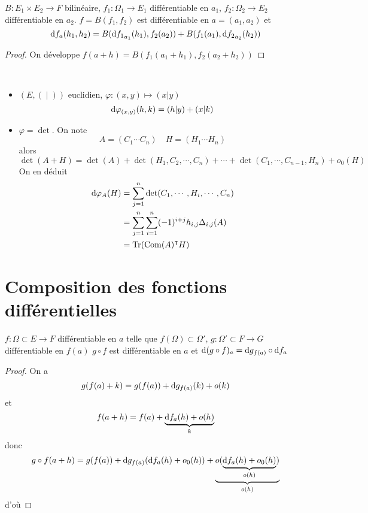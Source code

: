 \begin{prop}
    \Hyp $B:E_1\times E_2\to F$ bilinéaire, $f_1:\Omega_1\to E_1$ différentiable en $a_1$, $f_2:\Omega_2\to E_2$ différentiable en $a_2$.
    \Conc $f=B(f_1, f_2)$ est différentiable en $a=(a_1, a_2)$ et \[\mathrm{d} f_a(h_1, h_2)=B(\mathrm{d} {f_1}_{a_1}(h_1), f_2(a_2))+B(f_1(a_1), \mathrm{d} {f_2}_{a_2}(h_2)) \]
\end{prop}

\begin{proof}
On développe $f(a+h)=B(f_1(a_1+h_1), f_2(a_2+h_2))$
\end{proof}

\begin{ex} ~
\begin{itemize}
    \item $(E, (\; |\; ))$ euclidien, $\varphi:(x, y)\longmapsto (x|y)$ \[
        \mathrm{d} \varphi_{(x, y)}(h, k)=(h|y)+(x|k)
    \]
    \item $\varphi = \det $. On note \[
        A = (C_1 \cdots C_n) \quad H=(H_1 \cdots H_n)
    \]
    alors \[
        \det(A+H)=\det(A)+\det(H_1, C_2, \cdots, C_n)+\cdots + \det(C_1, \cdots, C_{n-1}, H_n)+o_0(H)
    \]
    On en déduit \begin{align*}
        \mathrm{d} \varphi_A(H) &= \sum_{j=1}^n \det(C_1, \cdots, H_i, \cdots, C_n)\\
        &= \sum_{j=1}^n\sum_{i=1}^n(-1)^{i+j}h_{i, j}\Delta_{i, j}(A) \\
        &= \operatorname{Tr}(\operatorname{Com}(A)^\intercal H)
    \end{align*}
\end{itemize}
\end{ex}

\section{Composition des fonctions différentielles}

\begin{prop}
    \Hyp $f : \Omega \subset E \to F$ différentiable en $a$ telle que $f(\Omega)\subset \Omega'$, $g : \Omega'\subset F \to G$ différentiable en $f(a)$
    \Conc $g\circ f$ est différentiable en $a$ et $\mathrm{d} (g\circ f)_a=\mathrm{d} g_{f(a)}\circ \mathrm{d} f_a$
\end{prop}

\begin{proof}
    On a \[
        g(f(a)+k)=g(f(a))+\mathrm{d} g_{f(a)}(k)+o(k)
    \]
    et \[
        f(a+h)=f(a)+\underbrace{\mathrm{d} f_a(h)+o(h)}_{k}
    \]
    donc \[
        g\circ f(a+h)=g(f(a))+\mathrm{d} g_{f(a)}(\mathrm{d} f_a(h)+o_0(h)) + \underbrace{o(\underbrace{\mathrm{d} f_a(h)+o_0(h)}_{o(h)})}_{o(h)}
    \]
    d'où \conc
\end{proof}

